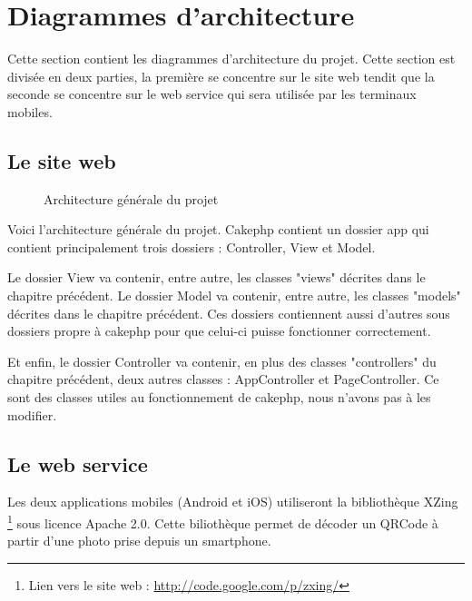 \chapter{Diagrammes d'architecture}

Cette section contient les diagrammes d'architecture du projet. Cette section est divisée en deux parties, la première se concentre sur le site web tendit que la seconde se concentre sur le web service qui sera utilisée par les terminaux mobiles.
 
\newpage
\section{Le site web}

\begin{figure}[H]
	\begin{center}\end{center}
	\caption{Architecture générale du projet}
\end{figure}

Voici l'architecture générale du projet. Cakephp contient un dossier app qui contient principalement trois dossiers : Controller, View et Model. 

Le dossier View va contenir, entre autre, les classes "views" décrites dans le chapitre précédent. Le dossier Model va contenir, entre autre, les classes "models" décrites dans le chapitre précédent. Ces dossiers contiennent aussi d'autres sous dossiers propre à cakephp pour que celui-ci puisse fonctionner correctement.


Et enfin, le dossier Controller va contenir, en plus des classes "controllers" du chapitre précédent, deux autres classes : AppController et PageController. Ce sont des classes utiles au fonctionnement de cakephp, nous n'avons pas à les modifier.

\section{Le web service}
Les deux applications mobiles (Android et iOS) utiliseront la bibliothèque XZing \footnote{Lien vers le site web : \href{http://code.google.com/p/zxing/}{http://code.google.com/p/zxing/}} sous licence Apache 2.0.
Cette biliothèque permet de décoder un QRCode à partir d'une photo prise depuis un smartphone.

